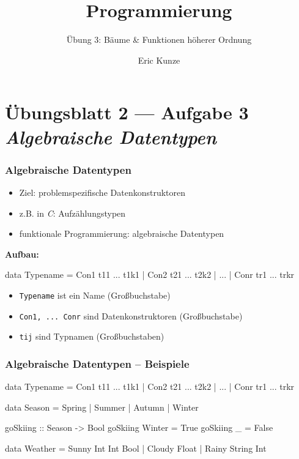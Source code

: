 \documentclass{beamer}
\begin{document}
	
	\title{Programmierung}
	\subtitle{Übung 3: Bäume \& Funktionen höherer Ordnung}
	\author{Eric Kunze}
	\date{}
	
	\maketitle
	



\section{Übungsblatt 2 --- Aufgabe 3 \\ \textit{\normalsize Algebraische Datentypen}}

\begin{frame}[fragile] \frametitle{Algebraische Datentypen}
	\footnotesize
	\begin{itemize}
		\item Ziel: problemspezifische Datenkonstruktoren
		\item z.B. in \textit{C}: Aufzählungstypen
		\item funktionale Programmierung: algebraische Datentypen
	\end{itemize}
	
	\textbf{Aufbau:}
	\begin{codebox}
data Typename 
	= Con1 t11 ... t1k1
	| Con2 t21 ... t2k2
	| ...
	| Conr tr1 ... trkr
	\end{codebox}
	\begin{itemize}
		\item \texttt{Typename} ist ein Name (Großbuchstabe)
		\item \texttt{Con1, ... Conr} sind Datenkonstruktoren (Großbuchstabe)
		\item \texttt{tij} sind Typnamen (Großbuchstaben)
	\end{itemize}
\end{frame}

\begin{frame}[fragile] \frametitle{Algebraische Datentypen -- Beispiele}
	
	\begin{codebox}
data Typename 
	= Con1 t11 ... t1k1
	| Con2 t21 ... t2k2
	| ...
	| Conr tr1 ... trkr
	\end{codebox}
	
	\begin{codebox}
data Season = Spring | Summer | Autumn | Winter
	\end{codebox}
	\pause
	\begin{codebox}
goSkiing :: Season -> Bool
goSkiing Winter = True
goSkiing _      = False
	\end{codebox}
	\pause
	\begin{codebox}
data Weather = Sunny Int Int Bool | Cloudy Float 
                                  | Rainy String Int 
	\end{codebox}
\end{frame}
\end{document}
